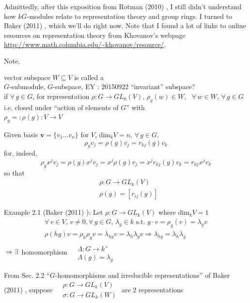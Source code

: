 Admittedly, after this exposition from Rotman (2010) \cite{dgdt:JRotman2010}, I still didn't understand how $kG$-modules relate to representation theory and group rings.  I turned to Baker (2011) \cite{dgdt:ABaker2011}, which we'll do right now.  Note that I found a lot of links to online resources on representation theory from Khovanov's webpage \url{http://www.math.columbia.edu/~khovanov/resource/}.  

Note, 
\begin{definition}
	vector subspace $W \subseteq V$ is called a \\
	$G$-submodule, $G$-subspace, EY : 20150922 ``invariant'' subspace? \\
	if $\forall \, g \in G$, for representation $\rho : G \to GL_k(V)$, $\rho_g(w) \in W$, \, $\forall \, w \in W$, $\forall \, g \in G$ i.e. closed under ``action of elements of $G$'' with \\
	$\rho_g =: \rho (g): V \to V$
\end{definition}

Given basis $\mathbf{v} = \lbrace v_1 \dots v_n \rbrace$ for $V$, $\text{dim}_kV = n$, $\forall \, g \in G$, 
\[
\rho_g v_j = \rho(g) v_j = r_{kj}(g) v_k
\]
for, indeed, 
\[
\rho_g x^j v_j = \rho(g) x^j v_j = x^j\rho(g) v_j = x^j r_{kj}(g) v_k = r_{kj} x^j v_k
\]
so that 
\[
\begin{aligned}
& \rho : G \to GL_k(V) \\ 
& \rho(g) = [r_{ij}(g)]
\end{aligned}
\]

Example 2.1 (Baker (2011) \cite{dgdt:ABaker2011}): Let $\rho :G \to GL_k(V)$ where $\text{dim}_kV=1$
\[
\begin{gathered}
\forall \, v \in V, \, v\neq 0 , \forall \, g \in G, \, \lambda_g \in k \text{ s.t. } g \cdot v = \rho_g(v) = \lambda_g v \\ 
\rho(hg) v = \rho_h \rho_g v = \lambda_{hg} v = \lambda_h \lambda_g v \Longrightarrow \lambda_{hg} = \lambda_h \lambda_g
\end{gathered}
\]
$\Longrightarrow \exists \, $ homomorphism $\begin{aligned} & \quad \\
& \Lambda : G \to k^{\times } \\
& \Lambda(g) = \lambda_g \end{aligned}$


From Sec. 2.2 ``$G$-homomorphisms and irreducible representations'' of Baker (2011) \cite{dgdt:ABaker2011}, suppose $\begin{aligned} & \rho : G \to GL_k(V) \\
& \sigma : G \to GL_k(W) \end{aligned}$ are 2 representations

